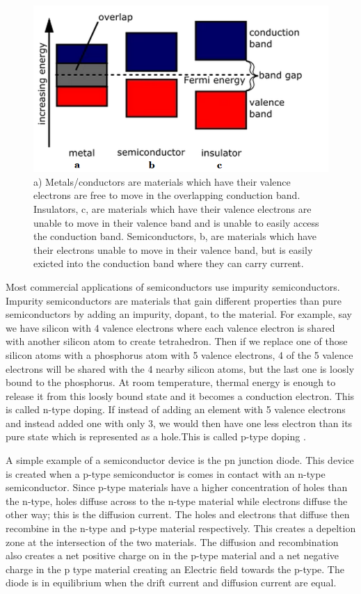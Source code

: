 \documentclass[ notitlepage, numerical, 11pt]{revtex4-1} %
\begin{document}
\begin{figure}[H]
\centerline{\includegraphics[scale=.45]{bandGap.png}}
\caption{a) Metals/conductors are materials which have their valence electrons are free to move in the overlapping conduction band. Insulators, c, are materials which have their valence electrons are unable to move in their valence band and is unable to easily access the conduction band. Semiconductors, b, are materials which have their electrons unable to move in their valence band, but is easily exicted into the conduction band where they can carry current.}
\label{bandGap}
\end{figure}


Most commercial applications of semiconductors use impurity semiconductors. Impurity semiconductors are materials that gain different properties than pure semiconductors by adding an impurity, dopant, to the material. For example, say we have silicon with 4 valence electrons where each valence electron is shared with another silicon atom to create tetrahedron. Then if we replace one of those silicon atoms with a phosphorus atom with 5 valence electrons, 4 of the 5 valence electrons will be shared with the 4 nearby silicon atoms, but the last one is loosly bound to the phosphorus. At room temperature, thermal energy is enough to release it from this loosly bound state and it becomes a conduction electron. This is called n-type doping. If instead of adding an element with 5 valence electrons and instead added one with only 3, we would then have one less electron than its pure state which is represented as a hole.This is called p-type doping \cite{purcell}.

A simple example of a semiconductor device is the pn junction diode. This device is created when a p-type semiconductor is comes in contact with an n-type semiconductor. Since p-type materials have a higher concentration of holes than the n-type, holes diffuse across to the n-type material while electrons diffuse the other way; this is the diffusion current. The holes and electrons that diffuse then recombine in the n-type and p-type material respectively. This creates a depeltion zone at the intersection of the two materials. The diffusion and recombination also creates a net positive charge on in the p-type material and a net negative charge in the p type material creating an Electric field towards the p-type. The diode is in equilibrium when the drift current and diffusion current are equal.
\end{document}
